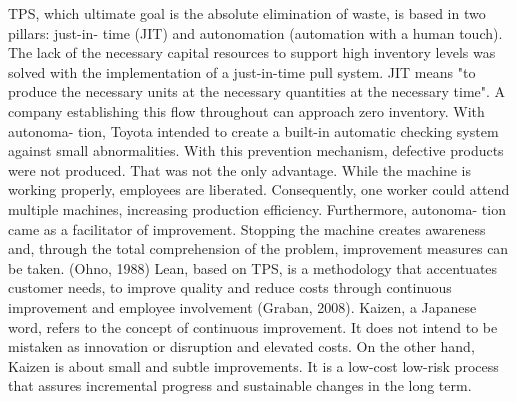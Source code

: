 \documentclass[]{article}
\begin{document}
TPS, which ultimate goal is the absolute elimination of waste, is based in two pillars: just-in-
time (JIT) and autonomation (automation with a human touch). The lack of the necessary capital
resources to support high inventory levels was solved with the implementation of a just-in-time
pull system. JIT means "to produce the necessary units at the necessary quantities at the necessary
time". A company establishing this flow throughout can approach zero inventory. With autonoma-
tion, Toyota intended to create a built-in automatic checking system against small abnormalities.
With this prevention mechanism, defective products were not produced. That was not the only
advantage. While the machine is working properly, employees are liberated. Consequently, one
worker could attend multiple machines, increasing production efficiency. Furthermore, autonoma-
tion came as a facilitator of improvement. Stopping the machine creates awareness and, through
the total comprehension of the problem, improvement measures can be taken. (Ohno, 1988)
Lean, based on TPS, is a methodology that accentuates customer needs, to improve quality
and reduce costs through continuous improvement and employee involvement (Graban, 2008).
Kaizen, a Japanese word, refers to the concept of continuous improvement. It does not intend
to be mistaken as innovation or disruption and elevated costs. On the other hand, Kaizen is about
small and subtle improvements. It is a low-cost low-risk process that assures incremental progress
and sustainable changes in the long term.
\end{document}
